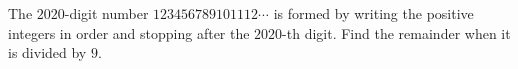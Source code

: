 The $2020$-digit number $123456789101112\cdots$ is formed by writing the positive integers in order and stopping after the $2020$-th digit. Find the remainder when it is divided by $9$.
